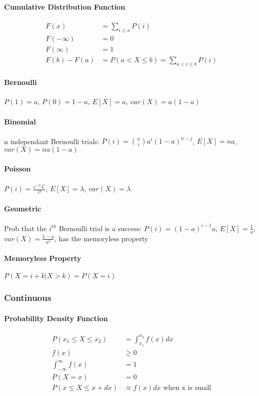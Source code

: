 \paragraph{Cumulative Distribution Function}
\begin{align*}
	F(x)       &= \sum_{i \le x} P(i) \\
	F(-\infty) &= 0 \\
	F(\infty)  &= 1 \\
	F(b)-F(a)  &= P(a < X \le b) = \sum_{a<i \le b} P(i)
\end{align*}

\paragraph{Bernoulli} $P(1) = a$, $P(0) = 1-a$, $E[X] = a$, $var(X) = a(1-a)$
\paragraph{Binomial} n independant Bernoulli trials:
$P(i) = {n \choose i} a^i(1-a)^{n-j}$,
$E[X] = na$,
$var(X) = na(1-a)$
\paragraph{Poisson} $P(i) = \frac{e^{-\lambda} \lambda^i}{i!}$, 
$E[X] = \lambda$, 
$var(X) = \lambda$
\paragraph{Geometric} Prob that the $i^{th}$ Bernoulli trial is a success:
$P(i) = (1-a)^{i-1}a$,
$E[X] = \frac{1}{a}$,
$var(X) = \frac{1-a}{a^2}$,
has the memoryless property
\paragraph{Memoryless Property} $P(X=i+k|X>k) = P(X=i)$

\subsubsection{Continuous}
\paragraph{Probability Density Function} 
\begin{align*}
	P(x_1 \le X \le x_2) &= \int_{x_1}^{x_2} f(x) dx \\
	f(x) &\ge 0 \\
	\int_{-\infty}^{\infty} f(x) &= 1 \\
	P(X=x)              &=        0 \\
	P(x \le X \le x+dx) & \approx f(x)dx \mbox{ when x is small}
\end{align*}

